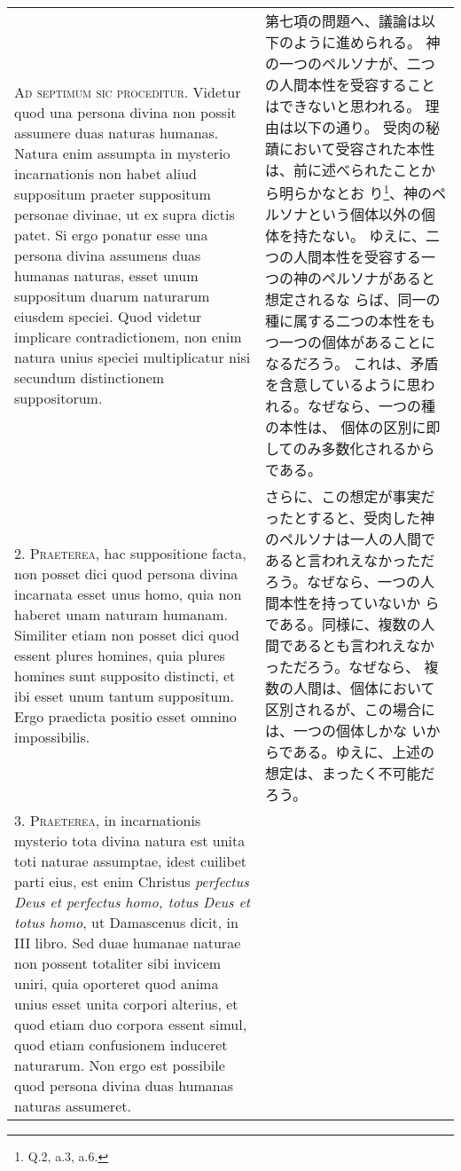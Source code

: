 \documentclass[10pt]{jsarticle} %
\begin{document}
\begin{longtable}{p{21em}p{21em}}


{\Huge A}{\scshape d septimum sic proceditur}. Videtur quod una persona divina non possit
assumere duas naturas humanas. Natura enim assumpta in mysterio
incarnationis non habet aliud suppositum praeter suppositum personae
divinae, ut ex supra dictis patet. Si ergo ponatur esse una persona
divina assumens duas humanas naturas, esset unum suppositum duarum
naturarum eiusdem speciei. Quod videtur implicare contradictionem, non
enim natura unius speciei multiplicatur nisi secundum distinctionem
suppositorum.


&

第七項の問題へ、議論は以下のように進められる。
神の一つのペルソナが、二つの人間本性を受容することはできないと思われる。
 理由は以下の通り。
 受肉の秘蹟において受容された本性は、前に述べられたことから明らかなとお
 り\footnote{Q.2, a.3, a.6.}、神のペルソナという個体以外の個体を持たない。
 ゆえに、二つの人間本性を受容する一つの神のペルソナがあると想定されるな
 らば、同一の種に属する二つの本性をもつ一つの個体があることになるだろう。
 これは、矛盾を含意しているように思われる。なぜなら、一つの種の本性は、
 個体の区別に即してのみ多数化されるからである。


\\



2. {\scshape Praeterea}, hac suppositione facta, non posset dici quod persona divina
incarnata esset unus homo, quia non haberet unam naturam
humanam. Similiter etiam non posset dici quod essent plures homines,
quia plures homines sunt supposito distincti, et ibi esset unum tantum
suppositum. Ergo praedicta positio esset omnino impossibilis.


&

さらに、この想定が事実だったとすると、受肉した神のペルソナは一人の人間で
 あると言われえなかっただろう。なぜなら、一つの人間本性を持っていないか
 らである。同様に、複数の人間であるとも言われえなかっただろう。なぜなら、
 複数の人間は、個体において区別されるが、この場合には、一つの個体しかな
 いからである。ゆえに、上述の想定は、まったく不可能だろう。

\\



3. {\scshape Praeterea}, in incarnationis mysterio tota divina natura est unita toti
naturae assumptae, idest cuilibet parti eius, est enim Christus
{\itshape perfectus Deus et perfectus homo, totus Deus et totus homo}, ut
Damascenus dicit, in III libro. Sed duae humanae naturae non possent
totaliter sibi invicem uniri, quia oporteret quod anima unius esset
unita corpori alterius, et quod etiam duo corpora essent simul, quod
etiam confusionem induceret naturarum. Non ergo est possibile quod
persona divina duas humanas naturas assumeret.



\end{longtable}
\end{document}
